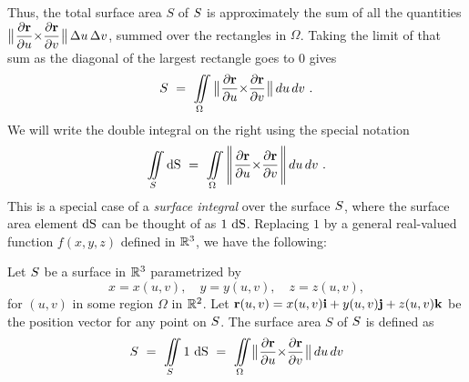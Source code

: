 Thus, the total surface area $S$ of $S$ is approximately the sum of all the quantities
$\bigl\lVert\mspace{1mu}\dfrac{\partial \mathbf{ r}}{\partial u} \mathbf{\times} \dfrac{\partial \mathbf{ r}}{\partial v}\mspace{1mu}\bigr\rVert\,\Delta u\,\Delta v$,
summed over the rectangles in $\Omega$. Taking the limit of that sum as the diagonal of the largest rectangle goes to $0$
gives
\begin{equation}
 S ~=~ \displaystyle\iint\limits_{\Omega}\,\bigl\lVert\mspace{1mu}\dfrac{\partial \mathbf{ r}}{\partial u} \mathbf{\times} \dfrac{\partial \mathbf{ r}}{\partial v}\mspace{1mu}\bigr\rVert
 \,du\,dv ~.
\end{equation}
We will write the double integral on the right using the special notation
\begin{equation}
 \diint\limits_{\superficie}  \d \S ~=~
 \diint\limits_{\Omega}\,\NORM{\Crossprod{\dfrac{\partial \vector{r}}{\partial u}}{\dfrac{\partial \vector{r}}{\partial v}}}
 \,du\,dv ~.
\end{equation}
This is a special case of a \emph{surface integral} over the surface $S$, where the surface area element
$\d \S$ can be thought of as $1\,\d \S$. Replacing $1$ by a general real-valued function $f(x,y,z)$ defined
in $\mathbb{R}^{3}$, we have the following:

\begin{df}
\label{defn:surfintreal}
 Let $S$ be a surface in $\mathbb{R}^{3}$ parametrized by
 \[x=x(u,v), \quad y=y(u,v), \quad z=z(u,v),\] for $(u,v)$ in some
  region $\Omega$ in $\mathbb{R}^{2}$. Let $\mathbf{ r}(u,v) = x(u,v) \mathbf{ i} + y(u,v) \mathbf{ j} + z(u,v) \mathbf{ k}$ be the
  position vector for any point on $S$. The surface area $S$ of $S$ is defined as 
  \begin{equation}
   S ~=~ \diint\limits_{\superficie} 1\,\d \S ~=~ \diint\limits_{\Omega}
  \Norm{\Crossprod{\dfrac{\partial \vector{r}}{\partial u}}{\dfrac{\partial \vector{r}}{\partial v}}}\,du\,dv
  \end{equation}
  \end{df}

